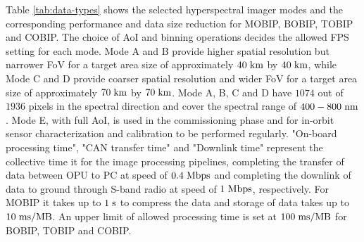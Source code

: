 
Table \ref{tab:data-types} shows the selected hyperspectral imager modes and the corresponding performance and data size reduction for MOBIP, BOBIP, TOBIP and COBIP. The choice of AoI and binning operations decides the allowed FPS setting for each mode. Mode A and B provide higher spatial resolution but narrower FoV for a target area size of approximately $40 \hspace{3pt} \rm{km}$ by $40 \hspace{3pt} \rm{km}$, while Mode C and D provide coarser spatial resolution and wider FoV for a target area size of approximately $70 \hspace{3pt} \rm{km}$ by $70 \hspace{3pt} \rm{km}$. Mode A, B, C and D have $1074$ out of $1936$ pixels in the spectral direction and cover the spectral range of $400-800 \hspace{3pt} \rm{nm}$. Mode E, with full AoI, is used in the commissioning phase and for in-orbit sensor characterization and calibration to be performed regularly. "On-board processing time", "CAN transfer time" and "Downlink time" represent the collective time it for the image processing pipelines, completing the transfer of data between OPU to PC at speed of $0.4 \hspace{3pt} \rm{Mbps}$ and completing the downlink of data to ground through S-band radio at speed of $1 \hspace{3pt} \rm{Mbps}$, respectively. For MOBIP it takes up to $1 \hspace{3pt} \rm{s}$ to compress the data and storage of data takes up to $10 \hspace{3pt} \rm{ms/MB}$. An upper limit of allowed processing time is set at $100 \hspace{3pt} \rm{ms/MB}$ for BOBIP, TOBIP and COBIP. 

